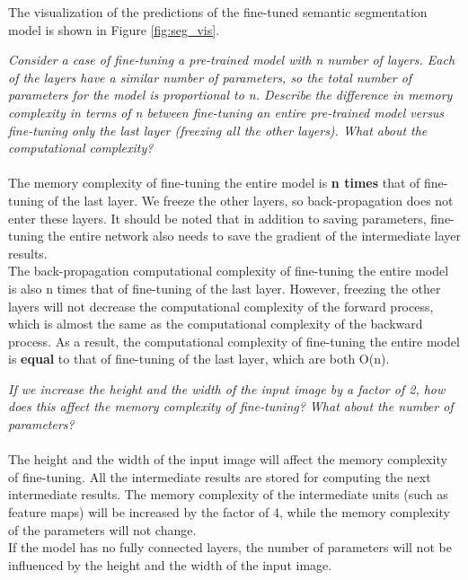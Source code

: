 \documentclass{myhw}
\begin{document}
\begin{homeworkProblem}
\begin{homeworkSection}
The visualization of the predictions of the fine-tuned semantic segmentation model is shown in Figure \ref{fig:seg_vis}.
\end{homeworkSection}
\begin{homeworkSection}
\emph{Consider a case of fine-tuning a pre-trained model with n number of layers. Each of the layers have a similar number of parameters, so the total number of parameters for the model is proportional to n. Describe the difference in memory complexity in terms of n between fine-tuning an entire pre-trained model versus fine-tuning only the last layer (freezing all the other layers). What about the computational complexity?} \\ \\
The memory complexity of fine-tuning the entire model is \textbf{n times} that of fine-tuning of the last layer.
We freeze the other layers, so back-propagation does not enter these layers.
It should be noted that in addition to saving parameters, fine-tuning the entire network also needs to save the gradient of the intermediate layer results. \\
The back-propagation computational complexity of fine-tuning the entire model is also n times that of fine-tuning of the last layer. However, freezing the other layers will not decrease the computational complexity of the forward process, which is almost the same as the computational complexity of the backward process. As a result, the computational complexity of fine-tuning the entire model is \textbf{equal} to that of fine-tuning of the last layer, which are both O(n).
\end{homeworkSection}
\begin{homeworkSection}
\emph{If we increase the height and the width of the input image by a factor of 2, how does this affect the memory complexity of fine-tuning? What about the number of parameters?} \\ \\
The height and the width of the input image will affect the memory complexity of fine-tuning. All the intermediate results are stored for computing the next intermediate results. The memory complexity of the intermediate units (such as feature maps) will be increased by the factor of 4, while the memory complexity of the parameters will not change.
\\ 
If the model has no fully connected layers, the number of parameters will not be influenced by the height and the width of the input image.
\end{homeworkSection}
\end{homeworkProblem}
\end{document}
